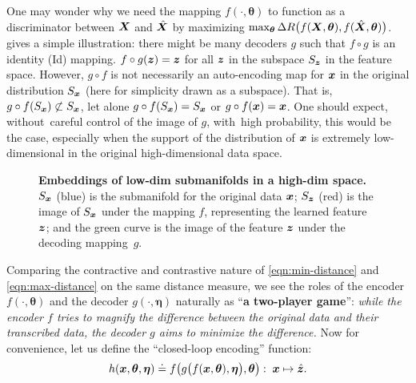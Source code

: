 \documentclass[../../book-main.tex]{subfiles}
\begin{document}
\begin{example}
One may wonder why we need the mapping $f(\cdot, \bm \theta)$ to function as a discriminator between $\bm{X}$ and $\hat {\bm{X}}$ by maximizing $\max_{\bm \theta} \Delta R\big(f(\bm{X},\bm \theta), f(\hat {\bm{X}}, \bm \theta)\big)$.  gives a simple illustration: there might be many decoders $g$ such that $f\circ g$ is an identity (Id) mapping. $f\circ g(\bm{z}) = \bm{z} $ for all $\bm{z}$ in the subspace $S_{\bm{z}}$ in the feature space. However, $g\circ f$ is not necessarily an auto-encoding map for $\bm{x}$ in the original distribution $S_{\bm{x}}$ (here for simplicity drawn as a subspace). That is, $g\circ f(S_{\bm{x}}) \not\subset S_{\bm{x}}$, let alone $g\circ f(S_{\bm{x}}) = S_{\bm{x}}$ or $g\circ f(\bm{x}) = \bm{x}$. One should expect, without~careful control of the image of $g$, with~high probability, this would be the case, especially when the support of the distribution of $\bm{x}$ is extremely  low-dimensional in the original high-dimensional data space. 
\end{example}
\begin{figure}
\caption{\textbf{{Embeddings} %
 of low-dim submanifolds in a high-dim space.} $S_{\bm{x}}$ (blue) is the submanifold for the original data $\bm{x}$; $S_{\bm{z}}$ (red) is the image of $S_{\bm{x}}$ under the mapping $f$, representing the learned feature $\bm{z}$; and the green curve  is the image of the feature $\bm{z}$ under the decoding \mbox{mapping $g$.} } \label{fig:decoder}
\end{figure} 

Comparing the contractive and contrastive nature of \eqref{eqn:min-distance} and \eqref{eqn:max-distance} on the same distance measure, we see the roles of the encoder $f(\cdot, \bm \theta)$ and the decoder $g(\cdot, \bm \eta)$ naturally as ``{\bf a  two-player game}'': {\em while the encoder $f$ tries to magnify the difference between the original data and their transcribed data, the decoder $g$ aims to minimize the difference.} Now for convenience, let us define the ``closed-loop encoding'' function:
\begin{equation}
    h(\bm{x}, \bm \theta,\bm \eta) \doteq f\big(g\big(f(\bm{x}, \bm \theta), \bm \eta\big), \bm \theta\big): \; \bm{x} \mapsto \hat {\bm{z}}.
\end{equation}
\end{document}
